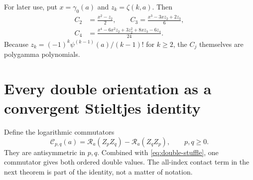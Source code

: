 \documentclass[11pt]{article}
\numberwithin{equation}{section}
\theoremstyle{definition}
\newcommand{\R}{\mathcal R}
\begin{document}
For later use, put $x=\gamma_0(a)$ and $z_k=\zeta(k,a)$. Then
\begin{align}
 C_2&=\frac{x^2-z_2}{2},\qquad
 C_3=\frac{x^3-3xz_2+2z_3}{6},\label{eq:C23}\\
 C_4&=\frac{x^4-6x^2z_2+3z_2^2+8xz_3-6z_4}{24}.
 \label{eq:C4}
\end{align}
Because $z_k=(-1)^k\psi^{(k-1)}(a)/(k-1)!$ for $k\ge2$,
the $C_j$ themselves are polygamma polynomials.

\section{Every double orientation as a convergent Stieltjes identity}
\label{sec:commutators}
Define the logarithmic commutators
\begin{equation}\label{eq:commutator-def}
 \mathcal C_{p,q}(a)=\R_a(Z_pZ_q)-\R_a(Z_qZ_p),\qquad p,q\ge0.
\end{equation}
They are antisymmetric in $p,q$. Combined with
\eqref{eq:double-stuffle}, one commutator gives both ordered double
values. The all-index contact term in the next theorem is part of the
identity, not a matter of notation.
\end{document}
